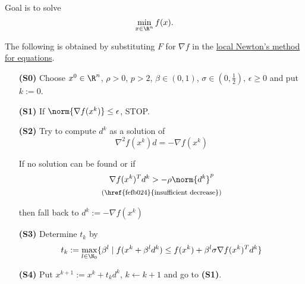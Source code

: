 \label{a7a5665}

Goal is to solve
$$
  \min_{x\in\R^n}f(x).
$$

The following is obtained by substituting $F$ for $\nabla f$ in the
\href{abbc9be}{local Newton's method for equations}.

\begin{enumerate}
  \item [\textbf{(S0)}] Choose $x^0\in\R^n$, $\rho>0$, $p>2$, $\beta\in(0,1)$, $\sigma\in(0,\frac12)$, $\epsilon\geq0$ and put $k:=0$.
  \item [\textbf{(S1)}] If $\norm{\nabla f(x^k)}\leq\epsilon$, STOP.
  \item [\textbf{(S2)}] Try to compute $d^k$ as a solution of
        $$
          \nabla^2f(x^k)d=-\nabla f(x^k)
        $$

        If no solution can be found or if
        \begin{gather*}
          \nabla f(x^k)^Td^k>-\rho\norm{d^k}^p\\
          \text{\footnotesize{(\href{fefb024}{insufficient decrease})}}
        \end{gather*}

        then fall back to $d^k:=-\nabla f(x^k)$
  \item [\textbf{(S3)}] Determine $t_k$ by
        $$
          t_k:=\max_{l\in\N_0}\{\beta^l\mid f(x^k+\beta^ld^k)\leq f(x^k)+\beta^l\sigma\nabla f(x^k)^Td^k\}
        $$
  \item [\textbf{(S4)}] Put $x^{k+1}:=x^k+t_kd^k$, $k\gets k+1$ and go to \textbf{(S1)}.
\end{enumerate}
